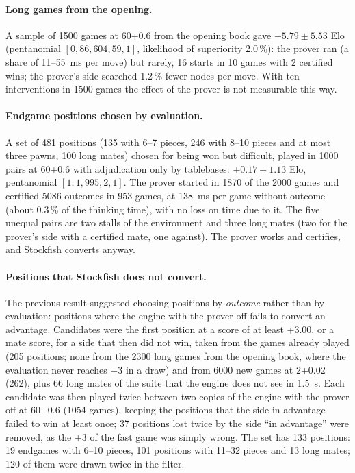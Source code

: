 \documentclass{article}
\theoremstyle{plain}
\theoremstyle{definition}
\theoremstyle{remark}
\begin{document}
\paragraph{Long games from the opening.} A sample of 1500 games at 60+0.6 from the opening book gave $-5.79 \pm 5.53$ Elo (pentanomial $[0, 86, 604, 59, 1]$, likelihood of superiority 2.0\,\%): the prover ran (a share of 11--55~ms per move) but rarely, 16 starts in 10 games with 2 certified wins; the prover's side searched 1.2\,\% fewer nodes per move. With ten interventions in 1500 games the effect of the prover is not measurable this way.

\paragraph{Endgame positions chosen by evaluation.} A set of 481 positions (135 with 6--7 pieces, 246 with 8--10 pieces and at most three pawns, 100 long mates) chosen for being won but difficult, played in 1000 pairs at 60+0.6 with adjudication only by tablebases: $+0.17 \pm 1.13$ Elo, pentanomial $[1, 1, 995, 2, 1]$. The prover started in 1870 of the 2000 games and certified 5086 outcomes in 953 games, at 138~ms per game without outcome (about 0.3\,\% of the thinking time), with no loss on time due to it. The five unequal pairs are two stalls of the environment and three long mates (two for the prover's side with a certified mate, one against). The prover works and certifies, and Stockfish converts anyway.

\paragraph{Positions that Stockfish does not convert.} The previous result suggested choosing positions by \emph{outcome} rather than by evaluation: positions where the engine with the prover off fails to convert an advantage. Candidates were the first position at a score of at least $+3.00$, or a mate score, for a side that then did not win, taken from the games already played (205 positions; none from the 2300 long games from the opening book, where the evaluation never reaches $+3$ in a draw) and from 6000 new games at 2+0.02 (262), plus 66 long mates of the suite that the engine does not see in 1.5~s. Each candidate was then played twice between two copies of the engine with the prover off at 60+0.6 (1054 games), keeping the positions that the side in advantage failed to win at least once; 37 positions lost twice by the side ``in advantage'' were removed, as the $+3$ of the fast game was simply wrong. The set has 133 positions: 19 endgames with 6--10 pieces, 101 positions with 11--32 pieces and 13 long mates; 120 of them were drawn twice in the filter.
\end{document}
